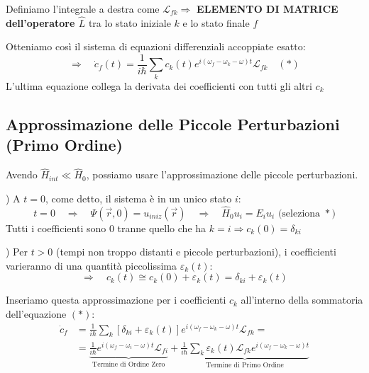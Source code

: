 \documentclass[11pt, a4paper]{article}
\begin{document}
\noindent
Definiamo l'integrale a destra come $\mathcal{L}_{fk} \Rightarrow$ \textbf{ELEMENTO DI MATRICE dell'operatore $\hat{L}$} tra lo stato iniziale $k$ e lo stato finale $f$ %

Otteniamo così il sistema di equazioni differenziali accoppiate esatto: %
\begin{equation}
    \Rightarrow \quad \dot{c}_f(t) = \frac{1}{i\hbar} \sum_k c_k(t) e^{i(\omega_f - \omega_k - \omega)t} \mathcal{L}_{fk} \quad (*) %
\end{equation}
L'ultima equazione collega la derivata dei coefficienti con tutti gli altri $c_k$ %

\subsection{Approssimazione delle Piccole Perturbazioni (Primo Ordine)} %

Avendo $\hat{H}_{int} \ll \hat{H}_0$, possiamo usare l'approssimazione delle piccole perturbazioni. %

) A $t=0$, come detto, il sistema è in un unico stato $i$: %
\begin{equation*}
    t=0 \quad \Rightarrow \quad \Psi(\vec{r}, 0) = u_{iniz}(\vec{r}) \quad \Rightarrow \quad \hat{H}_0 u_i = E_i u_i \text{ (seleziona } * \text{)} %
\end{equation*}
Tutti i coefficienti sono $0$ tranne quello che ha $k=i \Rightarrow c_k(0) = \delta_{ki}$ %

) Per $t > 0$ (tempi non troppo distanti e piccole perturbazioni), i coefficienti varieranno di una quantità piccolissima $\varepsilon_k(t)$: %
\begin{equation*}
    \Rightarrow \quad c_k(t) \cong c_k(0) + \varepsilon_k(t) = \delta_{ki} + \varepsilon_k(t) %
\end{equation*}

\noindent
Inseriamo questa approssimazione per i coefficienti $c_k$ all'interno della sommatoria dell'equazione $(*)$: %
\begin{align*}
    \dot{c}_f &= \frac{1}{i\hbar} \sum_k \left[ \delta_{ki} + \varepsilon_k(t) \right] e^{i(\omega_f - \omega_k - \omega)t} \mathcal{L}_{fk} = \\ %
    &= \underbrace{ \frac{1}{i\hbar} e^{i(\omega_f - \omega_i - \omega)t} \mathcal{L}_{fi} }_{\text{Termine di Ordine Zero}} + \underbrace{ \frac{1}{i\hbar} \sum_k \varepsilon_k(t) \mathcal{L}_{fk} e^{i(\omega_f - \omega_k - \omega)t} }_{\text{Termine di Primo Ordine}} %
\end{align*}
\end{document}
